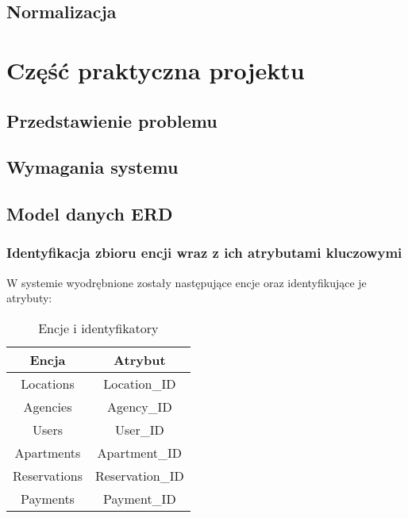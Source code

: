 \documentclass[polish, 11pt]{article}
\begin{document}
  		
    

    \subsection{Normalizacja}

\section{Część praktyczna projektu}
    \subsection{Przedstawienie problemu}

    \subsection{Wymagania systemu}
    
    \subsection{Model danych ERD}
        \subsubsection{Identyfikacja zbioru encji wraz z ich atrybutami kluczowymi}
            W systemie wyodrębnione zostały następujące encje oraz identyfikujące je atrybuty:
            \begin{table}[h]
                \centering
                \caption{Encje i identyfikatory}\label{tab:entitiesID}
                \begin{tabular}{cc}\toprule
                    Encja   	    &	Atrybut	\\\midrule
                    Locations	    &	Location\_ID	\\
                    Agencies	    &	Agency\_ID	\\
                    Users   	    &	User\_ID	\\
                    Apartments	    &	Apartment\_ID	\\
                    Reservations	&	Reservation\_ID	\\
                    Payments	    &	Payment\_ID	\\
                \bottomrule
                \end{tabular}
            \end{table}
\end{document}
